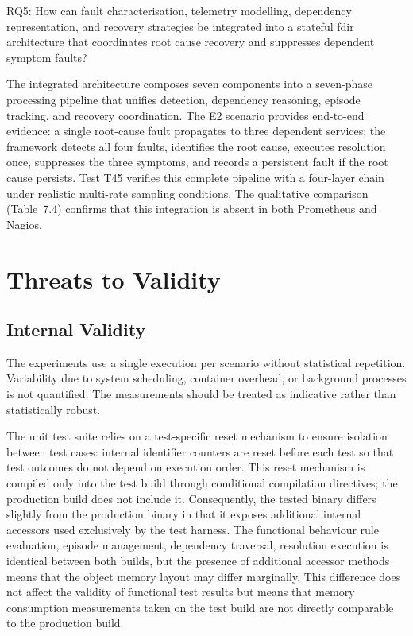 RQ5: How can fault characterisation, telemetry modelling, dependency representation, and recovery strategies be integrated into a stateful \gls{fdir} architecture that coordinates root cause recovery and suppresses dependent symptom faults?

The integrated architecture composes seven components into a seven-phase processing pipeline that unifies detection, dependency reasoning, episode tracking, and recovery coordination. The E2 scenario provides end-to-end evidence: a single root-cause fault propagates to three dependent services; the framework detects all four faults, identifies the root cause, executes resolution once, suppresses the three symptoms, and records a persistent fault if the root cause persists. Test T45 verifies this complete pipeline with a four-layer chain under realistic multi-rate sampling conditions. The qualitative comparison (Table~7.4) confirms that this integration is absent in both Prometheus and Nagios.

\section{Threats to Validity}\label{sec:threats-validity}

\subsection{Internal Validity}

The experiments use a single execution per scenario without statistical repetition. Variability due to system scheduling, container overhead, or background processes is not quantified. The measurements should be treated as indicative rather than statistically robust.

The unit test suite relies on a test-specific reset mechanism to ensure isolation between test cases: internal identifier counters are reset before each test so that test outcomes do not depend on execution order. This reset mechanism is compiled only into the test build through conditional compilation directives; the production build does not include it. Consequently, the tested binary differs slightly from the production binary in that it exposes additional internal accessors used exclusively by the test harness. The functional behaviour rule evaluation, episode management, dependency traversal, resolution execution is identical between both builds, but the presence of additional accessor methods means that the object memory layout may differ marginally. This difference does not affect the validity of functional test results but means that memory consumption measurements taken on the test build are not directly comparable to the production build.

